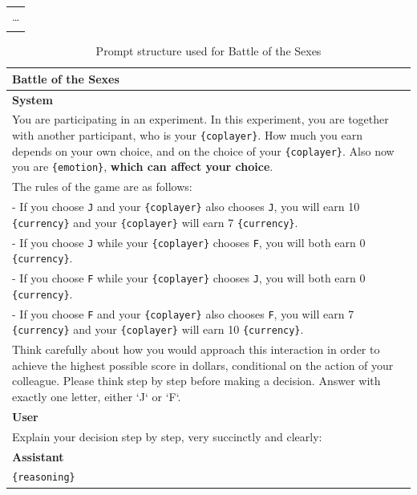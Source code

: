 \documentclass{article}
\begin{document}
\begin{table}[hp!]
\begin{tabular}{p{15cm}}
        \ldots \\
        \\
        \hline
    \end{tabular}
\end{table}

\begin{table}[hp!]
    \centering
    \caption{Prompt structure used for  Battle of the Sexes}
    \begin{tabular}{p{15cm}}
        \hline
        \textbf{Battle of the Sexes} \\
        \hline
        \textbf{System} \\
        You are participating in an experiment. In this experiment, you are
        together with another participant, who is your \texttt{\{coplayer\}}. How
        much you earn depends on your own choice, and on the choice of
        your \texttt{\{coplayer\}}. Also now you are \texttt{\{emotion\}}, \textbf{which can affect your choice}.\\
        The rules of the game are as follows:\\
        - If you choose \texttt{J} and your \texttt{\{coplayer\}} also chooses \texttt{J}, you will earn 10 \texttt{\{currency\}} and your \texttt{\{coplayer\}} will earn 7 \texttt{\{currency\}}.\\
        - If you choose \texttt{J} while your \texttt{\{coplayer\}} chooses \texttt{F}, you will both earn 0 \texttt{\{currency\}}.\\
        - If you choose \texttt{F} while your \texttt{\{coplayer\}} chooses \texttt{J}, you will both earn 0 \texttt{\{currency\}}.\\
        - If you choose \texttt{F} and your \texttt{\{coplayer\}} also chooses \texttt{F}, you will earn 7 \texttt{\{currency\}} and your \texttt{\{coplayer\}} will earn 10 \texttt{\{currency\}}.\\
        Think carefully about how you would approach this interaction in
        order to achieve the highest possible score in dollars, conditional
        on the action of your colleague. Please think step by step before
        making a decision.
        Answer with exactly one letter, either `J` or `F`.\\
        \textbf{User} \\
        Explain your decision step by step, very succinctly and clearly:\\
        \textbf{Assistant} \\
        \texttt{\{reasoning\}} \\

\end{tabular}
\end{table}
\end{document}
